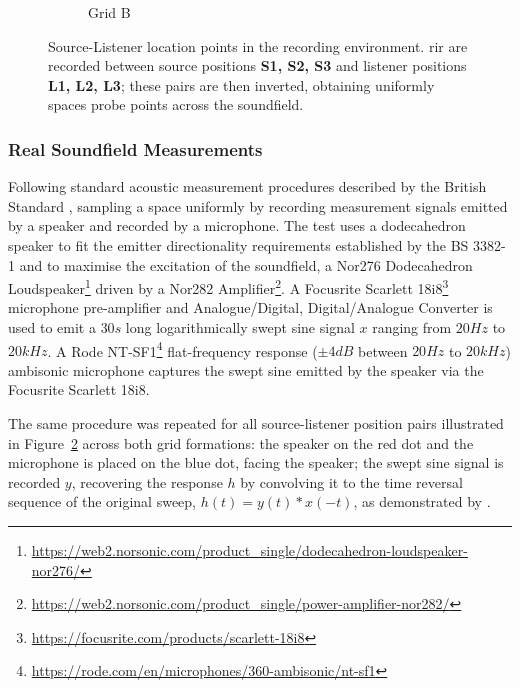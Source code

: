 \begin{figure}
\begin{subfigure}[t]{0.45\textwidth}
       \caption{Grid B}
       \label{fig:grid-b-probes}
    \end{subfigure}
\caption[Ray tracing testing --- visualisation of source-listener position pairs in the test scene.]{Source-Listener location points in the recording environment. \acrshort{rir} are recorded between source positions \textbf{S1, S2, S3} and listener positions \textbf{L1, L2, L3}; these pairs are then inverted, obtaining uniformly spaces probe points across the soundfield.}
\label{fig:rir-recording-probes}
\end{figure}

\subsubsection{Real Soundfield Measurements}
\label{sec:real_soundfield_measurement}
Following standard acoustic measurement procedures described by the British Standard \citep{bs3382-1}, sampling a space uniformly by recording measurement signals emitted by a speaker and recorded by a microphone. The test uses a dodecahedron speaker to fit the emitter directionality requirements established by the BS 3382-1 and to maximise the excitation of the soundfield, a Nor276 Dodecahedron Loudspeaker\footnote{\url{https://web2.norsonic.com/product_single/dodecahedron-loudspeaker-nor276/}} driven by a Nor282 Amplifier\footnote{\url{https://web2.norsonic.com/product_single/power-amplifier-nor282/}}. A Focusrite Scarlett 18i8\footnote{\url{https://focusrite.com/products/scarlett-18i8}} microphone pre-amplifier and Analogue/Digital, Digital/Analogue Converter is used to emit a $30s$ long logarithmically swept sine signal $x$ ranging from $20Hz$ to $20kHz$. A Rode NT-SF1\footnote{\url{https://rode.com/en/microphones/360-ambisonic/nt-sf1}} flat-frequency response ($\pm4dB$ between $20Hz$ to $20kHz$) ambisonic microphone captures the swept sine emitted by the speaker via the Focusrite Scarlett 18i8. \par
The same procedure was repeated for all source-listener position pairs illustrated in Figure~\ref{fig:rir-recording-probes} across both grid formations: the speaker on the red dot and the microphone is placed on the blue dot, facing the speaker; the swept sine signal is recorded $y$, recovering the response $h$ by convolving it to the time reversal sequence of the original sweep, $h(t) = y(t) * x(-t)$, as demonstrated by \cite{farina07}. \par

